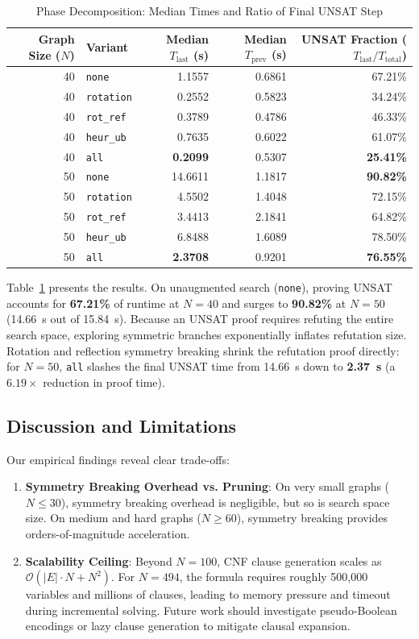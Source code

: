 \documentclass[a4paper,fleqn]{cas-sc}
\begin{document}
\begin{table}
\centering
\caption{Phase Decomposition: Median Times and Ratio of Final UNSAT Step}
\label{tab:table_ablation_phases}
\begin{tabular}{rlrrr}
\toprule
Graph Size ($N$) & Variant & Median $T_{\text{last}}$ (s) & Median $T_{\text{prev}}$ (s) & UNSAT Fraction ($T_{\text{last}} / T_{\text{total}}$) \\
\midrule
40 & \texttt{none} & 1.1557 & 0.6861 & 67.21\% \\
40 & \texttt{rotation} & 0.2552 & 0.5823 & 34.24\% \\
40 & \texttt{rot\_ref} & 0.3789 & 0.4786 & 46.33\% \\
40 & \texttt{heur\_ub} & 0.7635 & 0.6022 & 61.07\% \\
40 & \texttt{all} & \textbf{0.2099} & 0.5307 & \textbf{25.41\%} \\
\midrule
50 & \texttt{none} & 14.6611 & 1.1817 & \textbf{90.82\%} \\
50 & \texttt{rotation} & 4.5502 & 1.4048 & 72.15\% \\
50 & \texttt{rot\_ref} & 3.4413 & 2.1841 & 64.82\% \\
50 & \texttt{heur\_ub} & 6.8488 & 1.6089 & 78.50\% \\
50 & \texttt{all} & \textbf{2.3708} & 0.9201 & \textbf{76.55\%} \\
\bottomrule
\end{tabular}
\end{table}

Table~\ref{tab:table_ablation_phases} presents the results. On unaugmented search (\texttt{none}), proving UNSAT accounts for \textbf{67.21\%} of runtime at $N=40$ and surges to \textbf{90.82\%} at $N=50$ (14.66~s out of 15.84~s). Because an UNSAT proof requires refuting the entire search space, exploring symmetric branches exponentially inflates refutation size. Rotation and reflection symmetry breaking shrink the refutation proof directly: for $N=50$, \texttt{all} slashes the final UNSAT time from 14.66~s down to \textbf{2.37~s} (a $6.19\times$ reduction in proof time).

\subsection{Discussion and Limitations}
Our empirical findings reveal clear trade-offs:
\begin{enumerate}
    \item \textbf{Symmetry Breaking Overhead vs. Pruning}: On very small graphs ($N \le 30$), symmetry breaking overhead is negligible, but so is search space size. On medium and hard graphs ($N \ge 60$), symmetry breaking provides orders-of-magnitude acceleration.
    \item \textbf{Scalability Ceiling}: Beyond $N = 100$, CNF clause generation scales as $\mathcal{O}(|E| \cdot N + N^2)$. For $N = 494$, the formula requires roughly 500,000 variables and millions of clauses, leading to memory pressure and timeout during incremental solving. Future work should investigate pseudo-Boolean encodings or lazy clause generation to mitigate clausal expansion.
\end{enumerate}
\end{document}
